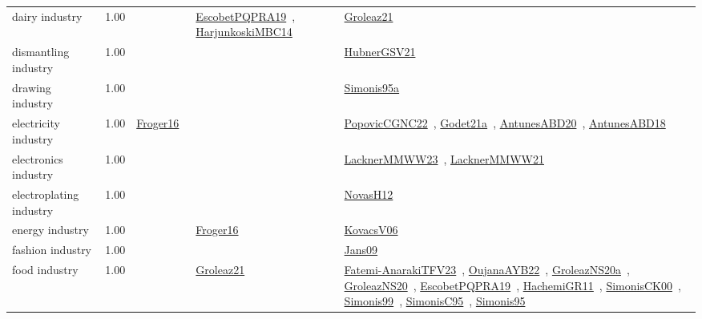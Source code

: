 {\begin{longtable}{p{3cm}r>{\raggedright\arraybackslash}p{6cm}>{\raggedright\arraybackslash}p{6cm}>{\raggedright\arraybackslash}p{8cm}}
\index{dairy industry}\index{Industries!dairy industry}dairy industry &  1.00 &  & \href{../works/EscobetPQPRA19.pdf}{EscobetPQPRA19}~\cite{EscobetPQPRA19}, \href{../works/HarjunkoskiMBC14.pdf}{HarjunkoskiMBC14}~\cite{HarjunkoskiMBC14} & \href{../works/Groleaz21.pdf}{Groleaz21}~\cite{Groleaz21}\\
\index{dismantling industry}\index{Industries!dismantling industry}dismantling industry &  1.00 &  &  & \href{../works/HubnerGSV21.pdf}{HubnerGSV21}~\cite{HubnerGSV21}\\
\index{drawing industry}\index{Industries!drawing industry}drawing industry &  1.00 &  &  & \href{../works/Simonis95a.pdf}{Simonis95a}~\cite{Simonis95a}\\
\index{electricity industry}\index{Industries!electricity industry}electricity industry &  1.00 & \href{../works/Froger16.pdf}{Froger16}~\cite{Froger16} &  & \href{../works/PopovicCGNC22.pdf}{PopovicCGNC22}~\cite{PopovicCGNC22}, \href{../works/Godet21a.pdf}{Godet21a}~\cite{Godet21a}, \href{../works/AntunesABD20.pdf}{AntunesABD20}~\cite{AntunesABD20}, \href{../works/AntunesABD18.pdf}{AntunesABD18}~\cite{AntunesABD18}\\
\index{electronics industry}\index{Industries!electronics industry}electronics industry &  1.00 &  &  & \href{../works/LacknerMMWW23.pdf}{LacknerMMWW23}~\cite{LacknerMMWW23}, \href{../works/LacknerMMWW21.pdf}{LacknerMMWW21}~\cite{LacknerMMWW21}\\
\index{electroplating industry}\index{Industries!electroplating industry}electroplating industry &  1.00 &  &  & \href{../works/NovasH12.pdf}{NovasH12}~\cite{NovasH12}\\
\index{energy industry}\index{Industries!energy industry}energy industry &  1.00 &  & \href{../works/Froger16.pdf}{Froger16}~\cite{Froger16} & \href{../works/KovacsV06.pdf}{KovacsV06}~\cite{KovacsV06}\\
\index{fashion industry}\index{Industries!fashion industry}fashion industry &  1.00 &  &  & \href{../works/Jans09.pdf}{Jans09}~\cite{Jans09}\\
\index{food industry}\index{Industries!food industry}food industry &  1.00 &  & \href{../works/Groleaz21.pdf}{Groleaz21}~\cite{Groleaz21} & \href{../works/Fatemi-AnarakiTFV23.pdf}{Fatemi-AnarakiTFV23}~\cite{Fatemi-AnarakiTFV23}, \href{../works/OujanaAYB22.pdf}{OujanaAYB22}~\cite{OujanaAYB22}, \href{../works/GroleazNS20a.pdf}{GroleazNS20a}~\cite{GroleazNS20a}, \href{../works/GroleazNS20.pdf}{GroleazNS20}~\cite{GroleazNS20}, \href{../works/EscobetPQPRA19.pdf}{EscobetPQPRA19}~\cite{EscobetPQPRA19}, \href{../works/HachemiGR11.pdf}{HachemiGR11}~\cite{HachemiGR11}, \href{../works/SimonisCK00.pdf}{SimonisCK00}~\cite{SimonisCK00}, \href{../works/Simonis99.pdf}{Simonis99}~\cite{Simonis99}, \href{../works/SimonisC95.pdf}{SimonisC95}~\cite{SimonisC95}, \href{../works/Simonis95.pdf}{Simonis95}~\cite{Simonis95}\\

\end{longtable}}
